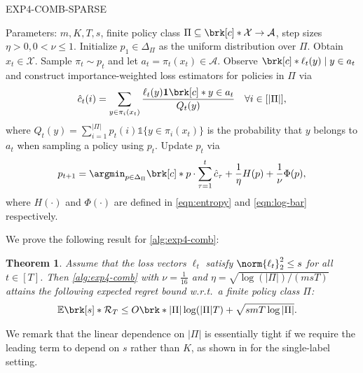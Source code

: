 \documentclass[11pt]{article}
\renewcommand{\ind}[1]{\mathds{1}\{#1\}}
\newcommand{\bbE}{\boldsymbol{\mathbb{E}}}
\renewcommand{\E}{\bbE}
\newcommand{\pred}{a}
\newcommand{\lab}{y}
\newcommand{\calX}{\mathcal{X}}
\newcommand{\calA}{\mathcal{A}}
\newcommand{\regret}{\mathcal{R}}
\theoremstyle{plain}
\newtheorem{theorem}{Theorem}
\begin{document}
\begin{algorithm}[ht]
\caption{EXP4-COMB-SPARSE}
\label{alg:exp4-comb}
    \begin{algorithmic}
        \STATE Parameters: $m, K, T, s$, finite policy class $\Pi \subseteq \brk[c]*{\calX \to \calA}$, step sizes $\eta > 0, 0 < \nu \leq 1$.
        \STATE Initialize $p_1 \in \Delta_\Pi$ as the uniform distribution over $\Pi$.
            \STATE Obtain $x_t \in \calX$.
            \STATE Sample $\pi_t \sim p_t$  and let $\pred_t = \pi_t(x_t) \in \calA$.
            \STATE Observe $\brk[c]*{\ell_t(\lab) \mid \lab \in \pred_t}$ and construct importance-weighted loss estimators for policies in $\Pi$ via
            \begin{align*}
                \hat c_t(i) = \sum_{\lab \in \pi_i(x_t)} \frac{\ell_t(\lab) \mathbf{1} \brk[c]*{\lab \in \pred_t}}{Q_t(\lab)} \quad \forall i \in [|\Pi|],
            \end{align*}
            where $Q_t(\lab) = \sum_{i=1}^{|\Pi|} p_t(i) \ind{\lab \in \pi_i(x_t)}$ is the probability that $\lab$ belongs to $\pred_t$ when sampling a policy using $p_t$.
            \STATE Update $p_t$ via
            \begin{align*}
                p_{t+1} = \argmin_{p \in \Delta_\Pi} \brk[c]*{p \cdot \sum_{\tau=1}^t \hat c_\tau + \frac{1}{\eta} H(p) + \frac{1}{\nu} \Phi(p)},
            \end{align*}
            where $H(\cdot)$ and $\Phi(\cdot)$ are defined in \cref{eqn:entropy} and \cref{eqn:log-bar} respectively.
        \ENDFOR
    \end{algorithmic}
\end{algorithm}



We prove the following result for \cref{alg:exp4-comb}:
% 
\begin{theorem}
\label{thm:exp4-comb-regret}
    Assume that the loss vectors $\ell_t$ satisfy $\norm{\ell_t}_2^2 \leq s$ for all $t \in [T]$. Then \cref{alg:exp4-comb} with $\nu = \frac{1}{16}$ and $\eta = \sqrt{\log (|\Pi|)/(msT)}$ attains the following expected regret bound w.r.t.~a finite policy class $\Pi$:
    \begin{align*}
        \E \brk[s]*{\regret_T} &\leq O \brk*{|\Pi| \log (|\Pi|T) + \sqrt{smT \log |\Pi|}}.
    \end{align*}
\end{theorem}
% 
We remark that the linear dependence on $|\Pi|$ is essentially tight if we require the leading term to depend on $s$ rather than $K$, as shown in \cite{erez2024real} for the single-label setting. 
\end{document}

